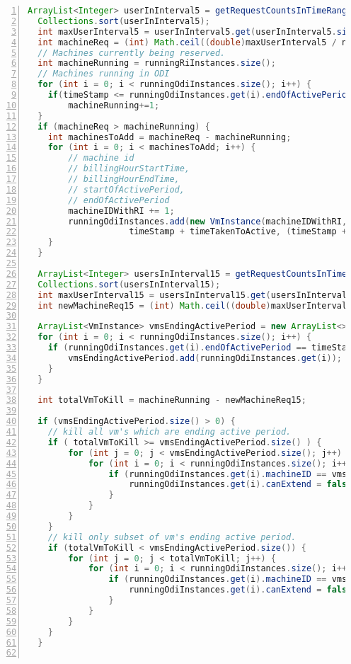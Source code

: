 
\begin{lstlisting}[language=java,caption=AppElastic Scaledown,label=list:appelasticscaledown,numbers=left,frame=single,fontadjust=true,breaklines]
  ArrayList<Integer> userInInterval5 = getRequestCountsInTimeRange(timeStamp, timeStamp + timeTakenToActive,false);
  Collections.sort(userInInterval5);
  int maxUserInterval5 = userInInterval5.get(userInInterval5.size() - 1);
  int machineReq = (int) Math.ceil((double)maxUserInterval5 / numberOfUserPerInstance);
  // Machines currently being reserved.
  int machineRunning = runningRiInstances.size();
  // Machines running in ODI
  for (int i = 0; i < runningOdiInstances.size(); i++) {
  	if(timeStamp <= runningOdiInstances.get(i).endOfActivePeriod)
  		machineRunning+=1;
  }
  if (machineReq > machineRunning) {
  	int machinesToAdd = machineReq - machineRunning;
  	for (int i = 0; i < machinesToAdd; i++) {
  		// machine id
  		// billingHourStartTime,
  		// billingHourEndTime,
  		// startOfActivePeriod,
  		// endOfActivePeriod
  		machineIDWithRI += 1;
  		runningOdiInstances.add(new VmInstance(machineIDWithRI, timeStamp, timeStamp + billingPeriod,
  					timeStamp + timeTakenToActive, (timeStamp + billingPeriod) - timetakenToShutdown));
  	}
  }

  ArrayList<Integer> usersInInterval15 = getRequestCountsInTimeRange(timeStamp, timeStamp + scaleDownLookAhead,true);
  Collections.sort(usersInInterval15);
  int maxUserInterval15 = usersInInterval15.get(usersInInterval15.size() - 1);
  int newMachineReq15 = (int) Math.ceil((double)maxUserInterval15 / numberOfUserPerInstance);

  ArrayList<VmInstance> vmsEndingActivePeriod = new ArrayList<>();
  for (int i = 0; i < runningOdiInstances.size(); i++) {
  	if (runningOdiInstances.get(i).endOfActivePeriod == timeStamp) {
  		vmsEndingActivePeriod.add(runningOdiInstances.get(i));
  	}
  }

  int totalVmToKill = machineRunning - newMachineReq15;

  if (vmsEndingActivePeriod.size() > 0) {
  	// kill all vm's which are ending active period.
  	if ( totalVmToKill >= vmsEndingActivePeriod.size() ) {
  		for (int j = 0; j < vmsEndingActivePeriod.size(); j++) {
  			for (int i = 0; i < runningOdiInstances.size(); i++) {
  				if (runningOdiInstances.get(i).machineID == vmsEndingActivePeriod.get(j).machineID) {
  					runningOdiInstances.get(i).canExtend = false;
  				}
  			}
  		}
  	}
  	// kill only subset of vm's ending active period.
  	if (totalVmToKill < vmsEndingActivePeriod.size()) {
  		for (int j = 0; j < totalVmToKill; j++) {
  			for (int i = 0; i < runningOdiInstances.size(); i++) {
  				if (runningOdiInstances.get(i).machineID == vmsEndingActivePeriod.get(j).machineID) {
  					runningOdiInstances.get(i).canExtend = false;
  				}
  			}
  		}
  	}
  }


\end{lstlisting}
